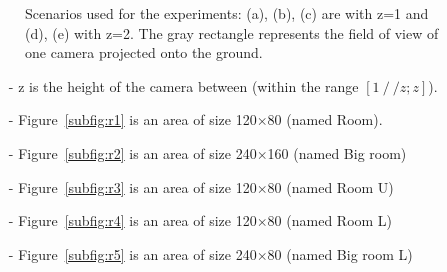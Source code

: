 \begin{figure}[!htb]
  \hspace*{\fill}
  \caption{Scenarios used for the experiments: (a), (b), (c) are   with z=1 and (d), (e) with z=2. The gray rectangle represents the field of view of one camera projected onto the ground.}
  \label{fig:Rooms_shapes}
\end{figure}



 

	
\begin{itemize}
\item[-]    z is the height of the camera between (within the range $[1⁄/z;z]$).
\item[-]	Figure~\ref{subfig:r1} is an area of size 120$\times$80 (named Room). 
\item[-]	Figure~\ref{subfig:r2} is an area of size 240$\times$160 (named Big room)
\item[-]	Figure~\ref{subfig:r3} is an area of size 120$\times$80 (named Room U)
\item[-]	Figure~\ref{subfig:r4} is an area of size 120$\times$80 (named Room L)
\item[-]	Figure~\ref{subfig:r5} is an area of size 240$\times$80 (named Big room L)
\end{itemize}





